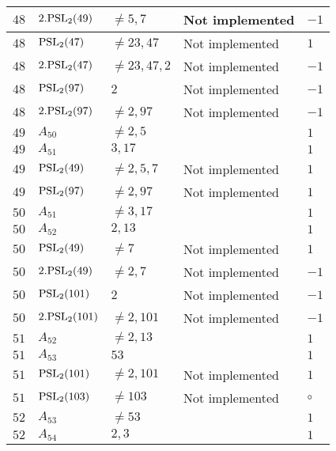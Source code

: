\documentclass[a4paper, 11pt]{article}
\begin{document}
\begin{longtable}{lllll}
        $ 48 $ & $ 2.{\rm PSL}_{2}(49) $ & $ \neq 5, 7 $ & Not implemented & $ -1  $ \\ \hline
        $ 48 $ & $ {\rm PSL}_{2}(47) $ & $ \neq 23, 47 $ & Not implemented & $ 1  $ \\ \hline
        $ 48 $ & $ 2.{\rm PSL}_{2}(47) $ & $ \neq 23, 47, 2 $ & Not implemented & $ -1  $ \\ \hline
        $ 48 $ & $ {\rm PSL}_{2}(97) $ & $ 2 $ & Not implemented & $ -1  $ \\ \hline
        $ 48 $ & $ 2.{\rm PSL}_{2}(97) $ & $ \neq 2, 97 $ & Not implemented & $ -1  $ \\ \hline
        $ 49 $ & $ A_{50} $ & $ \neq 2, 5 $ & $ ~ $ & $ 1  $ \\ \hline
        $ 49 $ & $ A_{51} $ & $ 3, 17 $ & $ ~ $ & $ 1  $ \\ \hline
        $ 49 $ & $ {\rm PSL}_{2}(49) $ & $ \neq 2, 5, 7 $ & Not implemented & $ 1  $ \\ \hline
        $ 49 $ & $ {\rm PSL}_{2}(97) $ & $ \neq 2, 97 $ & Not implemented & $ 1  $ \\ \hline
        $ 50 $ & $ A_{51} $ & $ \neq 3, 17 $ & $ ~ $ & $ 1  $ \\ \hline
        $ 50 $ & $ A_{52} $ & $ 2, 13 $ & $ ~ $ & $ 1  $ \\ \hline
        $ 50 $ & $ {\rm PSL}_{2}(49) $ & $ \neq 7 $ & Not implemented & $ 1  $ \\ \hline
        $ 50 $ & $ 2.{\rm PSL}_{2}(49) $ & $ \neq 2, 7 $ & Not implemented & $ -1  $ \\ \hline
        $ 50 $ & $ {\rm PSL}_{2}(101) $ & $ 2 $ & Not implemented & $ -1  $ \\ \hline
        $ 50 $ & $ 2.{\rm PSL}_{2}(101) $ & $ \neq 2, 101 $ & Not implemented & $ -1  $ \\ \hline
        $ 51 $ & $ A_{52} $ & $ \neq 2, 13 $ & $ ~ $ & $ 1  $ \\ \hline
        $ 51 $ & $ A_{53} $ & $ 53 $ & $ ~ $ & $ 1  $ \\ \hline
        $ 51 $ & $ {\rm PSL}_{2}(101) $ & $ \neq 2, 101 $ & Not implemented & $ 1  $ \\ \hline
        $ 51 $ & $ {\rm PSL}_{2}(103) $ & $ \neq 103 $ & Not implemented & $\circ$ \\ \hline
        $ 52 $ & $ A_{53} $ & $ \neq 53 $ & $ ~ $ & $ 1  $ \\ \hline
        $ 52 $ & $ A_{54} $ & $ 2, 3 $ & $ ~ $ & $ 1  $ \\ \hline

\end{longtable}
\end{document}
